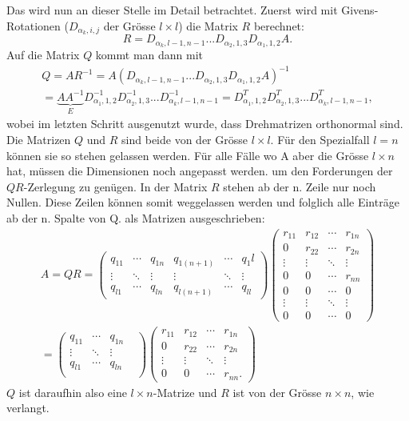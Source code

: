Das wird nun an dieser Stelle im Detail betrachtet.
Zuerst wird mit Givens-Rotationen ($D_{\alpha_k, i, j}$ der Grösse $l\times l$) die Matrix $R$ berechnet: 
\begin{equation*}
R = D_{\alpha_k,l-1,n-1}...D_{\alpha_2,1,3}D_{\alpha_1,1,2}A.		
\end{equation*}
Auf die Matrix $Q$ kommt man dann mit
\begin{multline*}
Q=AR^{-1}=A(D_{\alpha_k,l-1,n-1}...D_{\alpha_2,1,3}D_{\alpha_1,1,2}A)^{-1}\\=
\underbrace{AA^{-1}}_{E}D_{\alpha_1,1,2}^{-1}D_{\alpha_2,1,3}^{-1}... D_{\alpha_k, l-1,n-1}^{-1}=
D_{\alpha_1,1,2}^{T}D_{\alpha_2,1,3}^{T}...D_{\alpha_k, l-1,n-1}^{T},
\end{multline*}
wobei im letzten Schritt ausgenutzt wurde, dass Drehmatrizen orthonormal sind.
Die Matrizen $Q$ und $R$ sind beide von der Grösse $l\times l$.
Für den Spezialfall $l=n$ können sie so stehen gelassen werden.
Für alle Fälle wo A aber die Grösse $l\times n$ hat, müssen die Dimensionen noch angepasst werden. um den Forderungen der $QR$-Zerlegung zu genügen.
In der Matrix $R$ stehen ab der n. Zeile nur noch Nullen.
Diese Zeilen können somit weggelassen werden und folglich alle Einträge ab der n. Spalte von Q.
als Matrizen ausgeschrieben:
\begin{multline*}
A=QR=
\begin{pmatrix}
q_{11}&\cdots&q_{1n}&q_{1(n+1)}&\cdots&q_1l\\
\vdots&\ddots&\vdots&\vdots    &\ddots&\vdots\\
q_{l1}&\cdots&q_{ln}&q_{l(n+1)}&\cdots&q_{ll}
\end{pmatrix}
\begin{pmatrix}
r_{11}&r_{12}&\cdots&r_{1n}\\
0     &r_{22}&\cdots&r_{2n}\\
\vdots&\vdots&\ddots&\vdots\\
0     &0     &\cdots&r_{nn}\\
0     &0     &\cdots&0\\
\vdots&\vdots&\ddots&\vdots\\
0     &0     &\cdots&0
\end{pmatrix}\\=
\begin{pmatrix}
q_{11}&\cdots&q_{1n}&\\
\vdots&\ddots&\vdots&\\
q_{l1}&\cdots&q_{ln}\\
\end{pmatrix}
\begin{pmatrix}
r_{11}&r_{12}&\cdots&r_{1n}\\
0     &r_{22}&\cdots&r_{2n}\\
\vdots&\vdots&\ddots&\vdots\\
0     &0     &\cdots&r_{nn}.
\end{pmatrix}
\end{multline*}
$Q$ ist daraufhin also eine $l\times n$-Matrize und $R$ ist von der Grösse $n\times n$, wie verlangt.

